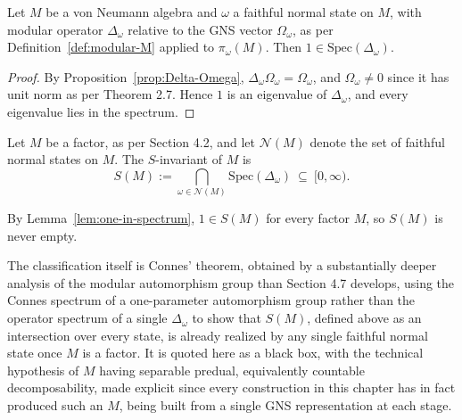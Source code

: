 \begin{lemma}\label{lem:one-in-spectrum}
	Let $M$ be a von Neumann algebra and $\omega$ a faithful normal state on $M$, with modular operator $\Delta_\omega$ relative to the GNS vector $\Omega_\omega$, as per Definition~\ref{def:modular-M} applied to $\pi_\omega(M)$. Then $1 \in \mathrm{Spec}(\Delta_\omega)$.
\end{lemma}

\begin{proof}
	By Proposition~\ref{prop:Delta-Omega}, $\Delta_\omega\Omega_\omega = \Omega_\omega$, and $\Omega_\omega \neq 0$ since it has unit norm as per Theorem 2.7. Hence $1$ is an eigenvalue of $\Delta_\omega$, and every eigenvalue lies in the spectrum.
\end{proof}

\begin{definition}\label{def:connes-S}
	Let $M$ be a factor, as per Section 4.2, and let $\mathcal{N}(M)$ denote the set of faithful normal states on $M$. The $S$-invariant of $M$ is
	\[
	S(M) := \bigcap_{\omega \in \mathcal{N}(M)} \mathrm{Spec}(\Delta_\omega) \ \subseteq \ [0,\infty).
	\]
\end{definition}

\noindent By Lemma~\ref{lem:one-in-spectrum}, $1 \in S(M)$ for every factor $M$, so $S(M)$ is never empty.

The classification itself is Connes' theorem, obtained by a substantially deeper analysis of the modular automorphism group than Section 4.7 develops, using the Connes spectrum of a one-parameter automorphism group rather than the operator spectrum of a single $\Delta_\omega$ to show that $S(M)$, defined above as an intersection over every state, is already realized by any single faithful normal state once $M$ is a factor. It is quoted here as a black box, with the technical hypothesis of $M$ having separable predual, equivalently countable decomposability, made explicit since every construction in this chapter has in fact produced such an $M$, being built from a single GNS representation at each stage.

